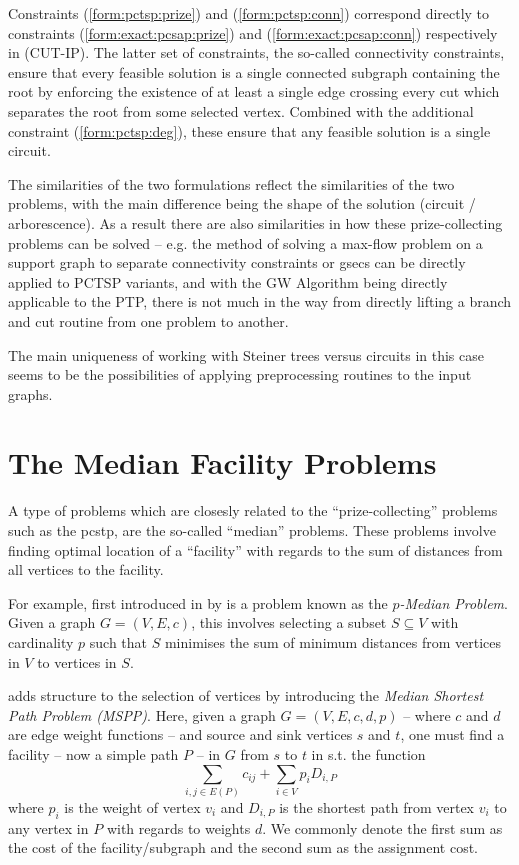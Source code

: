  Constraints (\ref{form:pctsp:prize}) and (\ref{form:pctsp:conn}) correspond directly to constraints
 (\ref{form:exact:pcsap:prize}) and (\ref{form:exact:pcsap:conn}) respectively in (CUT-IP).
 The latter set of constraints, the so-called connectivity constraints, ensure that every feasible solution
 is a single connected subgraph containing the root by enforcing the existence of at least a single edge crossing
 every cut which separates the root from some selected vertex. Combined with the
 additional constraint (\ref{form:pctsp:deg}), these ensure that any feasible solution is a single circuit.

 The similarities of the two formulations reflect the similarities of the two problems, with the main difference being
 the shape of the solution (circuit / arborescence).
 As a result there are also similarities in how these prize-collecting problems can be solved
 -- e.g. the method of solving a max-flow problem on a support graph
 to separate connectivity constraints or \glspl{gsec} can be directly applied to PCTSP variants, and with the GW Algorithm being
 directly applicable to the PTP, there is not much in the way from directly lifting a branch and cut routine from
 one problem to another.

 The main uniqueness of working with Steiner trees versus circuits in this case seems to be the possibilities of applying
 preprocessing routines to the input graphs.

 \section{The Median Facility Problems}
 \label{sec:related:median}
 A type of problems which are closesly related to the ``prize-collecting'' problems such as the \gls{pcstp}, are the so-called
 ``median'' problems. These problems involve finding optimal location of a ``facility'' with regards to the sum
 of distances from all vertices to the facility.

 For example, first introduced in \citeyear{hakimi1964optimum} by \citet{hakimi1964optimum} is a problem known as
 the \textit{$p$-Median Problem}. Given a graph $G = (V, E, c)$, this involves selecting a subset $S \subseteq V$ with
 cardinality $p$ such that $S$ minimises the sum of minimum distances from vertices in $V$ to vertices in $S$.
 
 \citet{current1987median} adds structure to the selection of vertices by introducing the \textit{Median Shortest Path Problem (MSPP)}.
 Here, given a graph $G = (V,E,c,d,p)$ -- where $c$ and $d$ are edge weight functions --
 and source and sink vertices $s$ and $t$, one must find a facility
  -- now a simple path $P$ --  in $G$
 from $s$ to $t$ in s.t. the function
 $$\sum_{i,j \in E(P)} c_{ij} + \sum_{i \in V} p_i D_{i, P}$$
 where $p_i$ is the weight of vertex $v_i$ and
 $D_{i, P}$ is the shortest path from vertex $v_i$ to any vertex in $P$ with regards to
 weights $d$.
 We commonly denote the first sum as the cost of the facility/subgraph and the second sum as the assignment cost.

